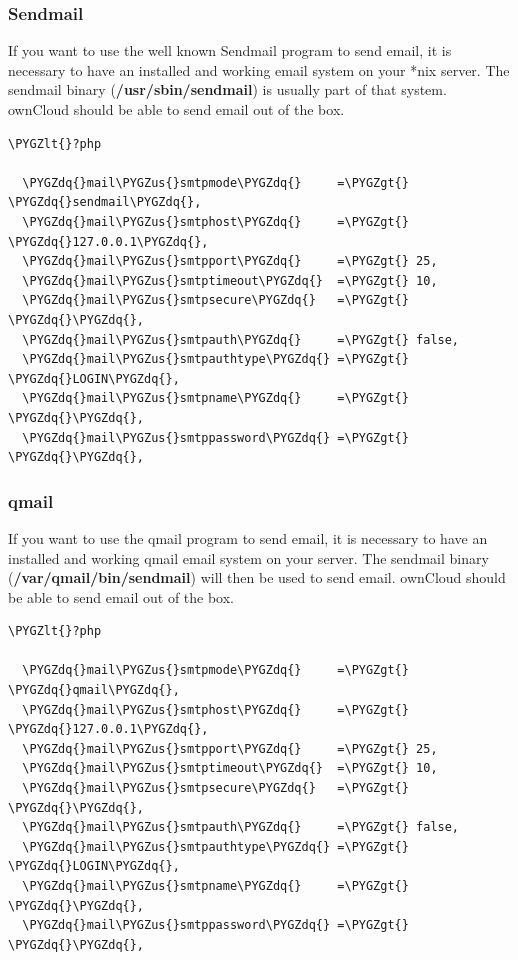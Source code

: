 \documentclass[letterpaper,10pt,english]{sphinxmanual}
\def\PYGZus{\char`\_}
\def\PYGZlt{\char`\<}
\def\PYGZgt{\char`\>}
\def\PYGZdq{\char`\"}
\begin{document}
\subsubsection{Sendmail}
\label{configuration_server/email_configuration:sendmail}
If you want to use the well known Sendmail program to send email, it is
necessary to have an installed and working email system on your *nix server.
The sendmail binary (\textbf{/usr/sbin/sendmail}) is usually part of that system.
ownCloud should be able to send email out of the box.

\begin{Verbatim}[commandchars=\\\{\}]
\PYGZlt{}?php

  \PYGZdq{}mail\PYGZus{}smtpmode\PYGZdq{}     =\PYGZgt{} \PYGZdq{}sendmail\PYGZdq{},
  \PYGZdq{}mail\PYGZus{}smtphost\PYGZdq{}     =\PYGZgt{} \PYGZdq{}127.0.0.1\PYGZdq{},
  \PYGZdq{}mail\PYGZus{}smtpport\PYGZdq{}     =\PYGZgt{} 25,
  \PYGZdq{}mail\PYGZus{}smtptimeout\PYGZdq{}  =\PYGZgt{} 10,
  \PYGZdq{}mail\PYGZus{}smtpsecure\PYGZdq{}   =\PYGZgt{} \PYGZdq{}\PYGZdq{},
  \PYGZdq{}mail\PYGZus{}smtpauth\PYGZdq{}     =\PYGZgt{} false,
  \PYGZdq{}mail\PYGZus{}smtpauthtype\PYGZdq{} =\PYGZgt{} \PYGZdq{}LOGIN\PYGZdq{},
  \PYGZdq{}mail\PYGZus{}smtpname\PYGZdq{}     =\PYGZgt{} \PYGZdq{}\PYGZdq{},
  \PYGZdq{}mail\PYGZus{}smtppassword\PYGZdq{} =\PYGZgt{} \PYGZdq{}\PYGZdq{},
\end{Verbatim}


\subsubsection{qmail}
\label{configuration_server/email_configuration:qmail}
If you want to use the qmail program to send email, it is necessary to have an
installed and working qmail email system on your server. The sendmail binary
(\textbf{/var/qmail/bin/sendmail}) will then be used to send email. ownCloud should
be able to send email out of the box.

\begin{Verbatim}[commandchars=\\\{\}]
\PYGZlt{}?php

  \PYGZdq{}mail\PYGZus{}smtpmode\PYGZdq{}     =\PYGZgt{} \PYGZdq{}qmail\PYGZdq{},
  \PYGZdq{}mail\PYGZus{}smtphost\PYGZdq{}     =\PYGZgt{} \PYGZdq{}127.0.0.1\PYGZdq{},
  \PYGZdq{}mail\PYGZus{}smtpport\PYGZdq{}     =\PYGZgt{} 25,
  \PYGZdq{}mail\PYGZus{}smtptimeout\PYGZdq{}  =\PYGZgt{} 10,
  \PYGZdq{}mail\PYGZus{}smtpsecure\PYGZdq{}   =\PYGZgt{} \PYGZdq{}\PYGZdq{},
  \PYGZdq{}mail\PYGZus{}smtpauth\PYGZdq{}     =\PYGZgt{} false,
  \PYGZdq{}mail\PYGZus{}smtpauthtype\PYGZdq{} =\PYGZgt{} \PYGZdq{}LOGIN\PYGZdq{},
  \PYGZdq{}mail\PYGZus{}smtpname\PYGZdq{}     =\PYGZgt{} \PYGZdq{}\PYGZdq{},
  \PYGZdq{}mail\PYGZus{}smtppassword\PYGZdq{} =\PYGZgt{} \PYGZdq{}\PYGZdq{},
\end{Verbatim}
\end{document}
